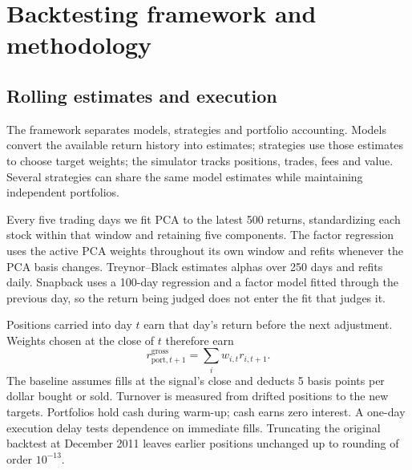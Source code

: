 

\section{Backtesting framework and methodology}
\label{sec:framework}

\subsection{Rolling estimates and execution}
The framework separates models, strategies and portfolio accounting. Models convert the
available return history into estimates; strategies use those estimates to choose target
weights; the simulator tracks positions, trades, fees and value. Several strategies can
share the same model estimates while maintaining independent portfolios.

Every five trading days we fit PCA to the latest 500 returns, standardizing each stock
within that window and retaining five components. The factor regression uses the active PCA
weights throughout its own window and refits whenever the PCA basis changes. Treynor--Black
estimates alphas over 250 days and refits daily. Snapback uses a 100-day regression and a
factor model fitted through the previous day, so the return being judged does not enter the
fit that judges it.

Positions carried into day $t$ earn that day's return before the next adjustment. Weights
chosen at the close of $t$ therefore earn
\[
    r_{\mathrm{port},t+1}^{\mathrm{gross}}=\sum_i w_{i,t}r_{i,t+1}.
\]
The baseline assumes fills at the signal's close and deducts 5 basis points per dollar
bought or sold. Turnover is measured from drifted positions to the new targets. Portfolios
hold cash during warm-up; cash earns zero interest. A one-day execution delay tests
dependence on immediate fills. Truncating the original backtest at December 2011 leaves
earlier positions unchanged up to rounding of order $10^{-13}$.

